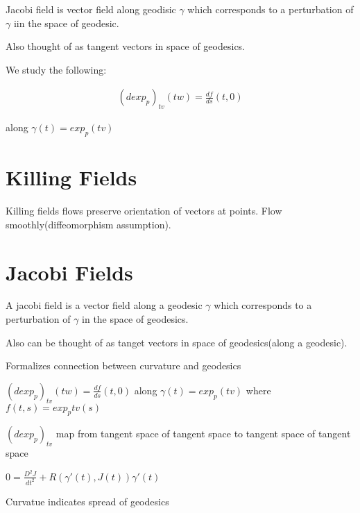 \documentclass[11pt]{article}
\begin{document}
Jacobi field is vector field along geodisic $\gamma$ which corresponds to a perturbation of $\gamma$ iin the space of geodesic.

Also thought of as tangent vectors in space of geodesics.

We study the following:

\begin{align*}
	(d exp_p)_{tv}(tw) = \frac{df}{ds}(t,0) 
\end{align*}

along $\gamma(t) = exp_p(tv)$

\section{Killing Fields}

\begin{rem}
	Killing fields flows preserve orientation of vectors at points. Flow smoothly(diffeomorphism assumption).
\end{rem}

\section{Jacobi Fields}

\begin{remark}
	A jacobi field is a vector field along a geodesic $\gamma$ which corresponds to a perturbation of $\gamma$ in the space of geodesics.

	Also can be thought of as tanget vectors in space of geodesics(along a geodesic).
\end{remark}

\begin{theme}
	Formalizes connection between curvature and geodesics
\end{theme}

\begin{defi}
	$(d exp_p)_{tv}(tw) = \frac{df}{ds}(t,0)$ along $\gamma(t) = exp_p(tv)$ where $f(t,s) = exp_p t v(s)$
\end{defi}

\begin{remark}
	$(d exp_p)_{tv}$ map from tangent space of tangent space to tangent space of tangent space 
\end{remark}

\begin{defi}
	$0 = \frac{D^2 J}{dt^2} + R(\gamma'(t),J(t))\gamma'(t)$
\end{defi}

\begin{remark}
	Curvatue indicates spread of geodesics
\end{remark}
\end{document}
